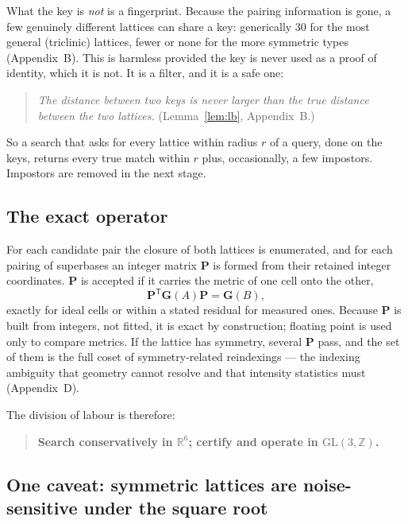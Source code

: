 \documentclass[11pt]{article}
\newcommand{\Gmet}{\mathbf{G}}
\newcommand{\Pop}{\mathbf{P}}
\begin{document}
What the key is \emph{not} is a fingerprint. Because the pairing information is gone, a few genuinely different lattices can share a key: generically 30 for the most general (triclinic) lattices, fewer or none for the more symmetric types (Appendix~B). This is harmless provided the key is never used as a proof of identity, which it is not. It is a filter, and it is a safe one:

\begin{quote}
\emph{The distance between two keys is never larger than the true distance between the two lattices.} (Lemma~\ref{lem:lb}, Appendix~B.)
\end{quote}

So a search that asks for every lattice within radius $r$ of a query, done on the keys, returns every true match within $r$ plus, occasionally, a few impostors. Impostors are removed in the next stage.

\subsection{The exact operator}

For each candidate pair the closure of both lattices is enumerated, and for each pairing of superbases an integer matrix $\Pop$ is formed from their retained integer coordinates. $\Pop$ is accepted if it carries the metric of one cell onto the other,
\[
\Pop^{\mathsf T}\Gmet(A)\Pop=\Gmet(B),
\]
exactly for ideal cells or within a stated residual for measured ones. Because $\Pop$ is built from integers, not fitted, it is exact by construction; floating point is used only to compare metrics. If the lattice has symmetry, several $\Pop$ pass, and the set of them is the full coset of symmetry-related reindexings --- the indexing ambiguity that geometry cannot resolve and that intensity statistics must (Appendix~D).

The division of labour is therefore:
\begin{quote}
\textbf{Search conservatively in $\mathbb R^6$; certify and operate in $\mathrm{GL}(3,\mathbb Z)$.}
\end{quote}

\subsection{One caveat: symmetric lattices are noise-sensitive under the square root}
\end{document}
